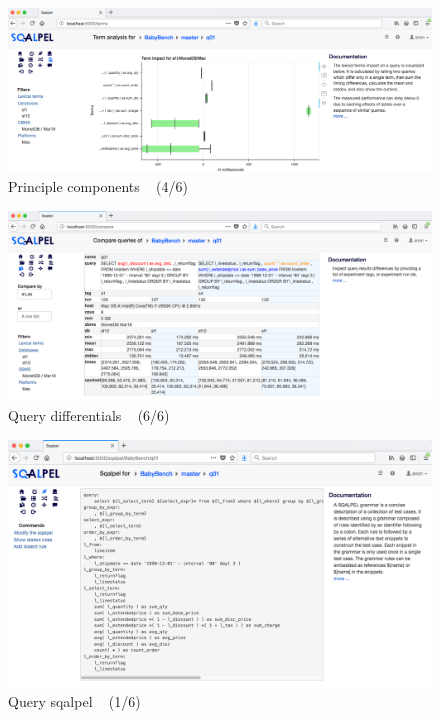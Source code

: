 \documentclass{cidr-2019}
\begin{document}

\begin{figure}[t!]
\centering
\includegraphics[width=\textwidth]{Figures/components2.png}
\caption{Principle components ~ \textsf{(4/6)}
	\label{fig:components}}
\end{figure}


\begin{figure}[t!]
\centering
\includegraphics[width=\textwidth]{Figures/compare2.png}
\caption{Query differentials ~ \textsf{(6/6)}
	\label{fig:differential}}
\end{figure}



\begin{figure}[t!]
  \centering
  \includegraphics[width=\textwidth]{Figures/scalpel2.png}
  \caption{Query {\sc sqalpel} ~ \textsf{(1/6)}
    \label{fig:sqalpel}}
\end{figure}
\end{document}
